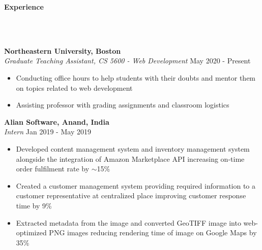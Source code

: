 \documentclass[]{article}
\newcommand{\lineunder} {
    \vspace*{-8pt} \\
    \hrulefill \\
}
\newcommand{\header} [1] {
    {\vspace*{6pt} \fontsize{12}{12}\selectfont \textbf{#1}}
     \lineunder
}
\begin{document}
\header{Experience}
\vspace{1mm}

\hspace{1mm}
\textbf{Northeastern University, Boston}\\
\hspace{1mm}
\textit{Graduate Teaching Assistant, CS 5600 - Web Development} \hfill May 2020 - Present\\
\vspace{-3mm}
\begin{itemize}
    \setlength\itemsep{-1mm}
    \item Conducting office hours to help students with their doubts and mentor them on topics related to web development
    \item Assisting professor with grading assignments and classroom logistics  
\end{itemize}
\vspace{-2mm}
\hspace{1mm}
\textbf{Alian Software, Anand, India}\\
\hspace{1mm}
\textit{Intern} \hfill Jan 2019 - May 2019\\
\vspace{-3mm}
\begin{itemize}
    \setlength\itemsep{-1mm}
    \item Developed content management system and inventory management system alongside the integration of Amazon Marketplace API increasing on-time order fulfilment rate by $\sim$15\%
	\item Created a customer management system providing required information to a customer representative at centralized place improving customer response time by 9\%
	\item Extracted metadata from the image and converted GeoTIFF image into web-optimized PNG images reducing rendering time of image on Google Maps by 35\%
\end{itemize}

\end{document}
